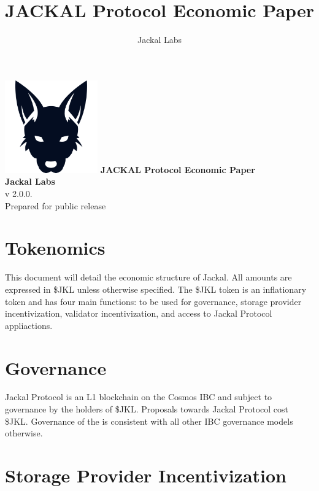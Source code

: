 \documentclass[11pt, nofootinbib]{article}
\title{JACKAL Protocol Economic Paper}
\author{Jackal Labs}
\begin{document}
\begin{titlepage}
    \centering
    \vspace*{3cm}
    \includegraphics[width=4cm]{jklimage.png} %
    \vskip2cm
    {\bfseries\Large
        JACKAL Protocol Economic Paper\\
        \vskip0.5cm
    }    
   {\bfseries
        Jackal Labs\\
    }    
    \vfill
    v 2.0.0. \\
    Prepared for public release
\end{titlepage}
\newpage
\tableofcontents
\newpage



\section{Tokenomics}

This document will detail the economic structure of Jackal. All amounts are expressed in \$JKL unless otherwise specified.
The \$JKL token is an inflationary token and has four main functions: to be used for governance, storage provider
incentivization, validator incentivization, and access to Jackal Protocol appliactions. 

\section{Governance}

Jackal Protocol is an L1 blockchain on the Cosmos IBC and subject to governance
by the holders of \$JKL. Proposals towards Jackal Protocol cost \$JKL. Governance
of the is consistent with all other IBC governance models otherwise.


\section{Storage Provider Incentivization}
\end{document}
